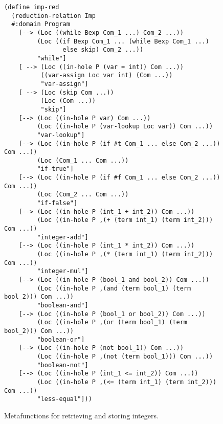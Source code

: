 \begin{figure}[ht]
\begin{verbatim}
(define imp-red 
  (reduction-relation Imp
  #:domain Program 
    [--> (Loc ((while Bexp Com_1 ...) Com_2 ...))
         (Loc ((if Bexp Com_1 ... (while Bexp Com_1 ...) 
                else skip) Com_2 ...))
         "while"]
    [ --> (Loc ((in-hole P (var = int)) Com ...))
          ((var-assign Loc var int) (Com ...))
          "var-assign"]
    [ --> (Loc (skip Com ...))
          (Loc (Com ...))
          "skip"]
    [--> (Loc ((in-hole P var) Com ...))
         (Loc ((in-hole P (var-lookup Loc var)) Com ...))
         "var-lookup"]
    [--> (Loc ((in-hole P (if #t Com_1 ... else Com_2 ...)) Com ...))
         (Loc (Com_1 ... Com ...))
         "if-true"]
    [--> (Loc ((in-hole P (if #f Com_1 ... else Com_2 ...)) Com ...))
         (Loc (Com_2 ... Com ...))
         "if-false"]
    [--> (Loc ((in-hole P (int_1 + int_2)) Com ...))
         (Loc ((in-hole P ,(+ (term int_1) (term int_2))) Com ...))
         "integer-add"]
    [--> (Loc ((in-hole P (int_1 * int_2)) Com ...))
         (Loc ((in-hole P ,(* (term int_1) (term int_2))) Com ...))
         "integer-mul"]
    [--> (Loc ((in-hole P (bool_1 and bool_2)) Com ...))
         (Loc ((in-hole P ,(and (term bool_1) (term bool_2))) Com ...))
         "boolean-and"]
    [--> (Loc ((in-hole P (bool_1 or bool_2)) Com ...))
         (Loc ((in-hole P ,(or (term bool_1) (term bool_2))) Com ...))
         "boolean-or"]
    [--> (Loc ((in-hole P (not bool_1)) Com ...))
         (Loc ((in-hole P ,(not (term bool_1))) Com ...))
         "boolean-not"]
    [--> (Loc ((in-hole P (int_1 <= int_2)) Com ...))
         (Loc ((in-hole P ,(<= (term int_1) (term int_2))) Com ...))
         "less-equal"]))
\end{verbatim}
\caption{Metafunctions for retrieving and storing integers.}
\label{imp-define-red}
\end{figure}
